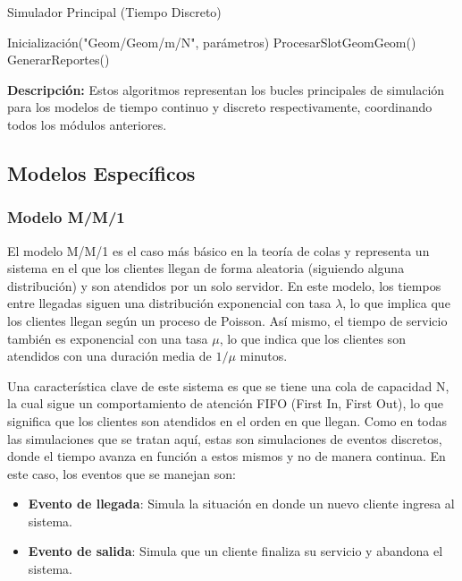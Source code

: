 \documentclass{article}
\begin{document}
\begin{algorithm}[H]
\caption{Simulador Principal (Tiempo Discreto)}
\begin{algorithmic}[1]
\STATE Inicialización("Geom/Geom/m/N", parámetros)
    \STATE ProcesarSlotGeomGeom()
\ENDFOR
\STATE GenerarReportes()
\end{algorithmic}
\end{algorithm}

\textbf{Descripción:} Estos algoritmos representan los bucles principales de simulación para los modelos de tiempo continuo y discreto respectivamente, coordinando todos los módulos anteriores.


\subsection{Modelos Específicos}
\subsubsection{Modelo M/M/1}

El modelo M/M/1 es el caso más básico en la teoría de colas y representa un sistema en el que los clientes llegan de forma aleatoria (siguiendo alguna distribución) y son atendidos por un solo servidor. En este modelo, los tiempos entre llegadas siguen una distribución exponencial con tasa $\lambda$, lo que implica que los clientes llegan según un proceso de Poisson. Así mismo, el tiempo de servicio también es exponencial con una tasa $\mu$, lo que indica que los clientes son atendidos con una duración media de $1/\mu$ minutos.

Una característica clave de este sistema es que se tiene una cola de capacidad N, la cual sigue un comportamiento de atención FIFO (First In, First Out), lo que significa que los clientes son atendidos en el orden en que llegan. Como en todas las simulaciones que se tratan aquí, estas son simulaciones de eventos discretos, donde el tiempo avanza en función a estos mismos y no de manera continua. En este caso, los eventos que se manejan son:

\begin{itemize}
    \item \textbf{Evento de llegada}: Simula la situación en donde un nuevo cliente ingresa al sistema.
    \item \textbf{Evento de salida}: Simula que un cliente finaliza su servicio y abandona el sistema.
\end{itemize}
\end{document}
